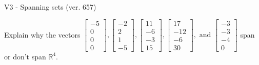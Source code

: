 \begin{exercise}
  \begin{exerciseTitle}V3 - Spanning sets (ver. 657)\end{exerciseTitle}
  \begin{exerciseStatement}
    Explain why the vectors \(\left[\begin{array}{r}
-5 \\
0 \\
0 \\
0
\end{array}\right] , \left[\begin{array}{r}
-2 \\
2 \\
1 \\
-5
\end{array}\right] , \left[\begin{array}{r}
11 \\
-6 \\
-3 \\
15
\end{array}\right] , \left[\begin{array}{r}
17 \\
-12 \\
-6 \\
30
\end{array}\right] , \text{ and } \left[\begin{array}{r}
-3 \\
-3 \\
-4 \\
0
\end{array}\right]\) span or don't span \(\mathbb{R}^4\). 
	



\end{exerciseStatement}
\end{exercise}
